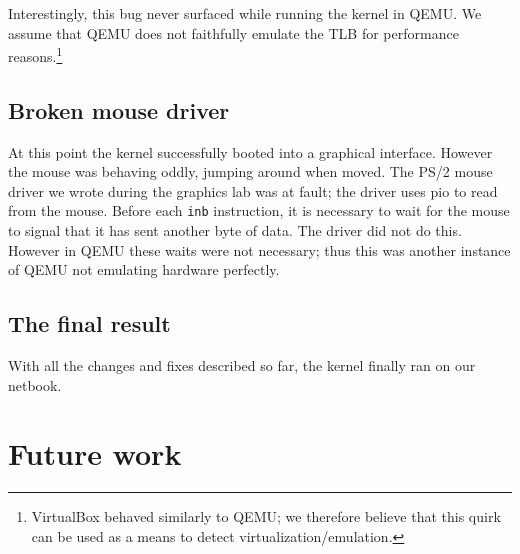 \documentclass{report}
\begin{document}
Interestingly, this bug never surfaced while running the kernel in QEMU. We
assume that QEMU does not faithfully emulate the TLB for performance
reasons.\footnote{VirtualBox behaved similarly to QEMU; we therefore believe
that this quirk can be used as a means to detect virtualization/emulation.}


\section{Broken mouse driver}
At this point the kernel successfully booted into a graphical interface.
However the mouse was behaving oddly, jumping around when moved. The PS/2
mouse driver we wrote during the graphics lab was at fault; the driver uses
\gls{pio} to read from the mouse. Before each \texttt{inb} instruction, it is
necessary to wait for the mouse to signal that it has sent another byte of
data. The driver did not do this. However in QEMU these waits were not
necessary; thus this was another instance of QEMU not emulating hardware
perfectly.


\section{The final result}
With all the changes and fixes described so far, the kernel finally ran on our
netbook.




\chapter{Future work}


% 
\end{document}
